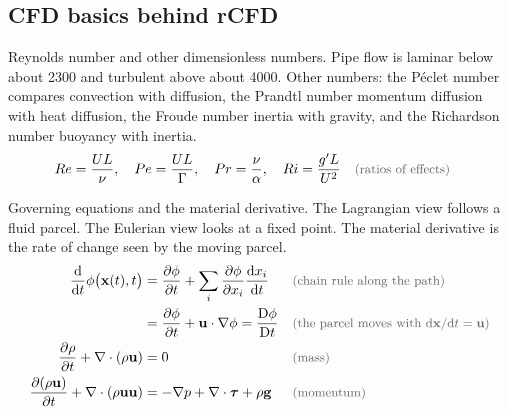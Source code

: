 \subsection{CFD basics behind rCFD}

\begin{qabox}{Reynolds number and other dimensionless numbers.}
\explain Pipe flow is laminar below about 2300 and turbulent above about 4000. Other numbers: the
P\'eclet number compares convection with diffusion, the Prandtl number momentum diffusion with heat
diffusion, the Froude number inertia with gravity, and the Richardson number buoyancy with inertia.
\derive
\begin{align*}
Re &= \frac{UL}{\nu},\quad Pe = \frac{UL}{\Gamma},\quad Pr = \frac{\nu}{\alpha},\quad Ri = \frac{g'L}{U^2} \why{ratios of effects}
\end{align*}
\end{qabox}

\begin{qabox}{Governing equations and the material derivative.}
\explain The Lagrangian view follows a fluid parcel. The Eulerian view looks at a fixed point. The
material derivative is the rate of change seen by the moving parcel.
\derive
\begin{align*}
\frac{\mathrm{d}}{\mathrm{d}t}\phi\bigl(\mathbf{x}(t),t\bigr) &= \frac{\partial\phi}{\partial t} + \sum_i\frac{\partial\phi}{\partial x_i}\frac{\mathrm{d}x_i}{\mathrm{d}t} \why{chain rule along the path} \\
&= \frac{\partial\phi}{\partial t} + \mathbf{u}\cdot\nabla\phi = \frac{\mathrm{D}\phi}{\mathrm{D}t} \why{the parcel moves with $\mathrm{d}\mathbf{x}/\mathrm{d}t = \mathbf{u}$} \\
\frac{\partial\rho}{\partial t} + \nabla\cdot(\rho\mathbf{u}) &= 0 \why{mass} \\
\frac{\partial(\rho\mathbf{u})}{\partial t} + \nabla\cdot(\rho\mathbf{u}\mathbf{u}) &= -\nabla p + \nabla\cdot\bm\tau + \rho\mathbf{g} \why{momentum}
\end{align*}
\end{qabox}

